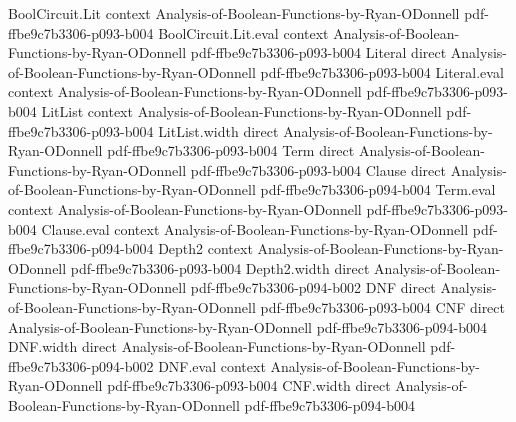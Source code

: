 \begin{lemma}
\leanok
{}
\proofstep
  {BoolCircuit.Lit}
  {context}
  {Analysis-of-Boolean-Functions-by-Ryan-ODonnell}
  {pdf-ffbe9c7b3306-p093-b004}
\proofstep
  {BoolCircuit.Lit.eval}
  {context}
  {Analysis-of-Boolean-Functions-by-Ryan-ODonnell}
  {pdf-ffbe9c7b3306-p093-b004}
\proofstep
  {Literal}
  {direct}
  {Analysis-of-Boolean-Functions-by-Ryan-ODonnell}
  {pdf-ffbe9c7b3306-p093-b004}
\proofstep
  {Literal.eval}
  {context}
  {Analysis-of-Boolean-Functions-by-Ryan-ODonnell}
  {pdf-ffbe9c7b3306-p093-b004}
\proofstep
  {LitList}
  {context}
  {Analysis-of-Boolean-Functions-by-Ryan-ODonnell}
  {pdf-ffbe9c7b3306-p093-b004}
\proofstep
  {LitList.width}
  {direct}
  {Analysis-of-Boolean-Functions-by-Ryan-ODonnell}
  {pdf-ffbe9c7b3306-p093-b004}
\proofstep
  {Term}
  {direct}
  {Analysis-of-Boolean-Functions-by-Ryan-ODonnell}
  {pdf-ffbe9c7b3306-p093-b004}
\proofstep
  {Clause}
  {direct}
  {Analysis-of-Boolean-Functions-by-Ryan-ODonnell}
  {pdf-ffbe9c7b3306-p094-b004}
\proofstep
  {Term.eval}
  {context}
  {Analysis-of-Boolean-Functions-by-Ryan-ODonnell}
  {pdf-ffbe9c7b3306-p093-b004}
\proofstep
  {Clause.eval}
  {context}
  {Analysis-of-Boolean-Functions-by-Ryan-ODonnell}
  {pdf-ffbe9c7b3306-p094-b004}
\proofstep
  {Depth2}
  {context}
  {Analysis-of-Boolean-Functions-by-Ryan-ODonnell}
  {pdf-ffbe9c7b3306-p093-b004}
\proofstep
  {Depth2.width}
  {direct}
  {Analysis-of-Boolean-Functions-by-Ryan-ODonnell}
  {pdf-ffbe9c7b3306-p094-b002}
\proofstep
  {DNF}
  {direct}
  {Analysis-of-Boolean-Functions-by-Ryan-ODonnell}
  {pdf-ffbe9c7b3306-p093-b004}
\proofstep
  {CNF}
  {direct}
  {Analysis-of-Boolean-Functions-by-Ryan-ODonnell}
  {pdf-ffbe9c7b3306-p094-b004}
\proofstep
  {DNF.width}
  {direct}
  {Analysis-of-Boolean-Functions-by-Ryan-ODonnell}
  {pdf-ffbe9c7b3306-p094-b002}
\proofstep
  {DNF.eval}
  {context}
  {Analysis-of-Boolean-Functions-by-Ryan-ODonnell}
  {pdf-ffbe9c7b3306-p093-b004}
\proofstep
  {CNF.width}
  {direct}
  {Analysis-of-Boolean-Functions-by-Ryan-ODonnell}
  {pdf-ffbe9c7b3306-p094-b004}
\proofstep

\end{lemma}
